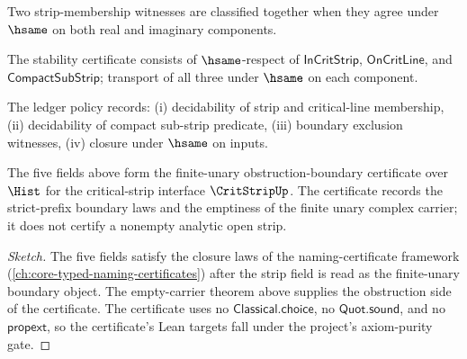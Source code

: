 \begin{definition}
\label{def:crit-strip-classifier-spec}
Two strip-membership witnesses are classified together when they agree under \(\hsame\) on both real and imaginary components.
\end{definition}

\begin{definition}
\label{def:crit-strip-stability-cert}
The stability certificate consists of \(\hsame\)-respect of \(\mathsf{InCritStrip}\), \(\mathsf{OnCritLine}\), and \(\mathsf{CompactSubStrip}\); transport of all three under \(\hsame\) on each component.
\end{definition}

\begin{definition}
\label{def:crit-strip-ledger-policy}
The ledger policy records: (i) decidability of strip and critical-line membership, (ii) decidability of compact sub-strip predicate, (iii) boundary exclusion witnesses, (iv) closure under \(\hsame\) on inputs.
\end{definition}

\begin{theorem}
\label{thm:crit-strip-namecert}
The five fields above form the finite-unary obstruction-boundary certificate
over $\Hist$ for the critical-strip interface $\CritStripUp$. The certificate
records the strict-prefix boundary laws and the emptiness of the finite unary
complex carrier; it does not certify a nonempty analytic open strip.
\end{theorem}
\begin{proof}[Sketch]
The five fields satisfy the closure laws of the naming-certificate framework
(\autoref{ch:core-typed-naming-certificates}) after the strip field is read as
the finite-unary boundary object. The empty-carrier theorem above supplies the
obstruction side of the certificate. The certificate uses no
$\mathsf{Classical.choice}$, no $\mathsf{Quot.sound}$, and no
$\mathsf{propext}$, so the certificate's Lean targets fall under the project's
axiom-purity gate.
\end{proof}

